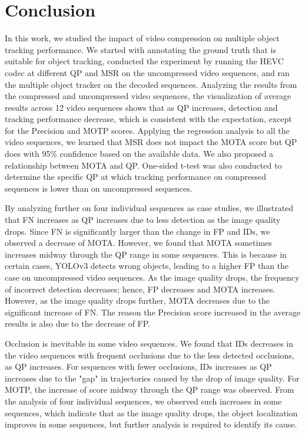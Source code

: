 \chapter{Conclusion}
\label{chap:conclusion}

In this work, we studied the impact of video compression on multiple object tracking performance. We started with annotating the ground truth that is suitable for object tracking, conducted the experiment by running the HEVC codec at different QP and MSR on the uncompressed video sequences, and ran the multiple object tracker on the decoded sequences. Analyzing the results from the compressed and uncompressed video sequences, the visualization of average results across 12 video sequences shows that as QP increases, detection and tracking performance decrease, which is consistent with the expectation, except for the Precision and MOTP scores. Applying the regression analysis to all the video sequences, we learned that MSR does not impact the MOTA score but QP does with 95\% confidence based on the available data. We also proposed a relationship between MOTA and QP. One-sided t-test was also conducted to determine the specific QP at which tracking performance on compressed sequences is lower than on uncompressed sequences.

By analyzing further on four individual sequences as case studies, we illustrated that FN increases as QP increases due to less detection as the image quality drops. Since FN is significantly larger than the change in FP and IDs, we observed a decrease of MOTA. However, we found that MOTA sometimes increases midway through the QP range in some sequences. This is because in certain cases, YOLOv3 detects wrong objects, leading to a higher FP than the case on uncompressed video sequences. As the image quality drops, the frequency of incorrect detection decreases; hence, FP decreases and MOTA increases. However, as the image quality drops further, MOTA decreases due to the significant increase of FN. The reason the Precision score increased in the average results is also due to the decrease of FP. 

Occlusion is inevitable in some video sequences. We found that IDs decreases in the video sequences with frequent occlusions due to the less detected occlusions, as QP increases. For sequences with fewer occlusions, IDs increases as QP increases due to the "gap" in trajectories caused by the drop of image quality. For MOTP, the increase of score midway through the QP range was observed. From the analysis of four individual sequences, we observed such increases in some sequences, which indicate that as the image quality drops, the object localization improves in some sequences, but further analysis is required to identify its cause. 


